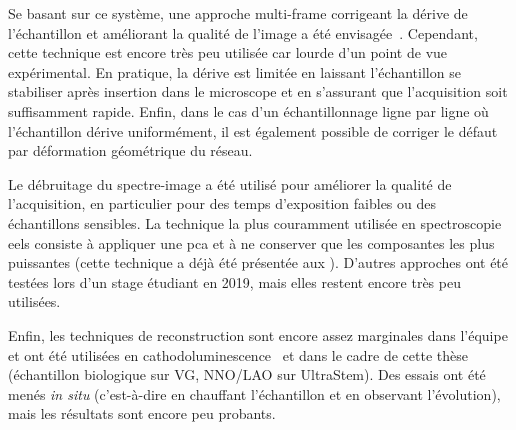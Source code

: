     Se basant sur ce système, une approche multi-frame corrigeant la dérive de l'échantillon et améliorant la qualité de l'image a été envisagée~\cite{zobelli2019spatial}. Cependant, cette technique est encore très peu utilisée car lourde d'un point de vue expérimental. En pratique, la dérive est limitée en laissant l'échantillon se stabiliser après insertion dans le microscope et en s'assurant que l'acquisition soit suffisamment rapide. Enfin, dans le cas d'un échantillonnage ligne par ligne où l'échantillon dérive uniformément, il est également possible de corriger le défaut par déformation géométrique du réseau.


    Le débruitage du spectre-image a été utilisé pour améliorer la qualité de l'acquisition, en particulier pour des temps d'exposition faibles ou des échantillons sensibles.  La technique la plus couramment utilisée en spectroscopie \gls{eels} consiste à appliquer une \gls{pca} et à ne conserver que les composantes les plus puissantes (cette technique a déjà été présentée aux ). D'autres approches ont été testées lors d'un stage étudiant en 2019, mais elles restent encore très peu utilisées.

    Enfin, les techniques de reconstruction sont encore assez marginales dans l'équipe et ont été utilisées en cathodoluminescence~\cite{zobelli2019spatial} et dans le cadre de cette thèse (échantillon biologique sur VG, NNO/LAO sur UltraStem). Des essais ont été menés \textit{in situ} (c'est-à-dire en chauffant l'échantillon et en observant l'évolution), mais les résultats sont encore peu probants.






%
%
%
%
%
%

